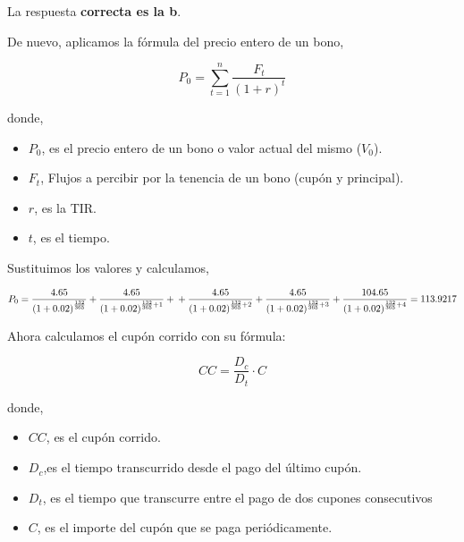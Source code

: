 \documentclass[
  letterpaper,
  DIV=11,
  numbers=noendperiod]{scrreprt}
\begin{document}
\begin{tcolorbox}[enhanced jigsaw, left=2mm, opacityback=0, colback=white, breakable, arc=.35mm, bottomrule=.15mm, rightrule=.15mm, toprule=.15mm, leftrule=.75mm, colframe=quarto-callout-tip-color-frame]
\begin{minipage}[t]{5.5mm}
\textcolor{quarto-callout-tip-color}{\faLightbulb}
\end{minipage}%
\begin{minipage}[t]{\textwidth - 5.5mm}

La respuesta \textbf{correcta es la b}.

De nuevo, aplicamos la fórmula del precio entero de un bono,

\[P_0=\sum_{ t=1}^{ n}\frac{F_t}{(1+r)^{t}}\]

donde,

\begin{itemize}
\item
  \(P_0\), es el precio entero de un bono o valor actual del mismo
  (\(V_0\)).
\item
  \(F_t\), Flujos a percibir por la tenencia de un bono (cupón y
  principal).
\item
  \(r\), es la TIR.
\item
  \(t\), es el tiempo.
\end{itemize}

Sustituimos los valores y calculamos,

\[P_0=\frac{4.65}{\left(1+0.02\right)^{\frac{132}{365}}}+
\frac{4.65}{\left(1+0.02\right)^{\frac{132}{365}+1}}+\\
+\frac{4.65}{\left(1+0.02\right)^{\frac{132}{365}+2}}+\frac{4.65}{\left(1+0.02\right)^{\frac{132}{365}+3}}+\frac{104.65}{\left(1+0.02\right)^{\frac{132}{365}+4}}=113.9217\]

Ahora calculamos el cupón corrido con su fórmula:

\[CC=\frac{D_c}{D_t}\cdot C\]

donde,

\begin{itemize}
\item
  \(CC\), es el cupón corrido.
\item
  \(D_{c}\),es el tiempo transcurrido desde el pago del último cupón.
\item
  \(D_{t}\), es el tiempo que transcurre entre el pago de dos cupones
  consecutivos
\item
  \(C\), es el importe del cupón que se paga periódicamente.
\end{itemize}


\end{minipage}
\end{tcolorbox}
\end{document}
